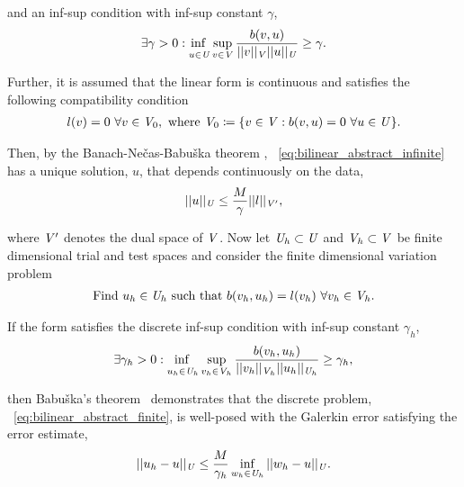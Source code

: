 and an inf-sup condition with inf-sup constant $\gamma$,
\begin{align} \label{eq:inf_sup_infinite}
\exists \gamma > 0 :
\adjustlimits\inf_{u\in\fspace{U}} \sup_{v\in\fspace{V}}
\frac{b(v,u)}{||v||_{\fspace{V}}||u||_{\fspace{U}}} \ge \gamma.
\end{align}

Further, it is assumed that the linear form is continuous and satisfies the following compatibility condition
\begin{align}
l(v) = 0\ \forall v \in \mathit{{{V}}}_0,\ \text{where}\ \mathit{{{V}}}_0 \coloneqq \{v \in \mathit{{{V}}} : b(v,u) = 0\ \forall u
\in \mathit{{{U}}} \}.
\end{align}

Then, by the Banach-Ne\v{c}as-Babu\v{s}ka theorem ,
~\eqref{eq:bilinear_abstract_infinite} has a unique solution, $u$, that depends continuously on the data,
\begin{align}
||u||_{\mathit{{{U}}}} \le \frac{M}{\gamma} ||l||_{\mathit{{{V}}}'},
\end{align}

where $\mathit{{{V}}}'$ denotes the dual space of $\mathit{{{V}}}$. Now let $\mathit{{{U}}}_h \subset \mathit{{{U}}}$ and $\mathit{{{V}}}_h
\subset \mathit{{{V}}}$ be finite dimensional trial and test spaces and consider the finite dimensional variation problem
\begin{align} \label{eq:bilinear_abstract_finite}
\text{Find}\ u_h \in \mathit{{{U}}}_h\ \text{such that}\
b(v_h,u_h) = l(v_h)\ \forall v_h \in \mathit{{{V}}}_h.
\end{align}

If the form satisfies the discrete inf-sup condition with inf-sup constant $\gamma_h$,
\begin{align} \label{eq:inf_sup_finite}
\exists \gamma_h > 0 :
\adjustlimits\inf_{u_h\in\fspace{U}_h} \sup_{v_h\in\fspace{V}_h}
\frac{b(v_h,u_h)}{||v_h||_{\fspace{V}_h}||u_h||_{\fspace{U}_h}} \ge \gamma_h,
\end{align}

then Babu\v{s}ka's theorem~\cite[Theorem ]{Babuska1971} demonstrates that the discrete problem,
~\eqref{eq:bilinear_abstract_finite}, is well-posed with the Galerkin error satisfying the error estimate,
\begin{align} \label{eq:abstract_dpg_error}
||u_h-u||_{\mathit{{{U}}}} \le \frac{M}{\gamma_h} \inf_{w_h \in \mathit{{{U}}}_h} ||w_h-u||_{\mathit{{{U}}}}.
\end{align}

